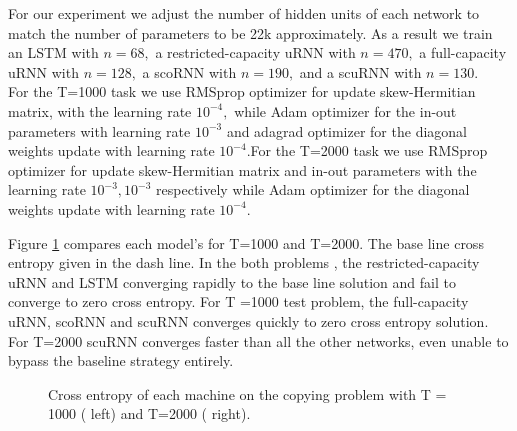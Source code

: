 \documentclass[letterpaper]{article} %
\begin{document}
\noindent For our experiment we adjust the number of hidden units of each network to match the number of parameters to be 22k approximately. As a result we train an LSTM with $n = 68,$ a restricted-capacity uRNN with $n=470,$ a full-capacity uRNN with $n= 128,$ a scoRNN with $n=190,$ and a scuRNN with $n=130$.\\

\noindent For the T=1000 task we use RMSprop optimizer for update skew-Hermitian matrix, with the learning rate $10^{-4},$ while Adam optimizer for the in-out parameters with learning rate $10^{-3}$ and adagrad optimizer for the diagonal weights update with learning rate $10^{-4}$.For the T=2000 task we use RMSprop optimizer for update skew-Hermitian matrix and in-out parameters with the learning rate $10^{-3},10^{-3}$ respectively  while Adam optimizer for the diagonal weights update with learning rate $10^{-4}$.

\noindent Figure \ref{fig_copying} compares each model's for T=1000 and T=2000. The base line cross entropy given in the dash line. In the both problems , the restricted-capacity uRNN and LSTM converging rapidly to the base line solution and fail to converge to zero cross entropy. For T =1000 test problem, the full-capacity uRNN, scoRNN and scuRNN converges quickly to zero cross entropy solution. For T=2000 scuRNN converges faster than all the other networks, even unable to bypass the baseline strategy entirely.\\

\begin{figure}
    \centering
    \qquad
    \caption{Cross entropy of each machine on the copying problem with T = 1000 ( left) and T=2000 ( right).}%
    \label{fig_copying}%
\end{figure}
\end{document}
